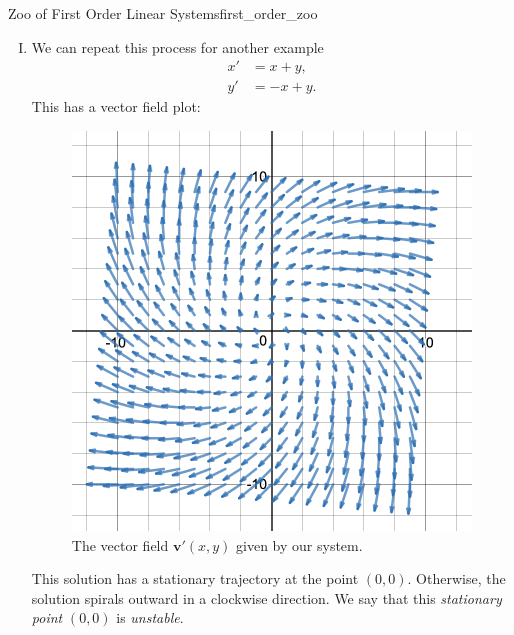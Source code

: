 \begin{ex}{Zoo of First Order Linear Systems}{first_order_zoo}
\begin{enumerate}[(I)]
            What we do next is pick an initial condition, $(x_0,y_0)$ and note that our vector field gives us the velocity vector $\mathbf{v}'(x_0,y_0)$ at that point. 
            
            The solution (curve/trajectory) to our system of ODE follows the vector field above since it describes the velocity of our curve at that point. We call this solution curve an \textbf{integral curve} as it is obtained (roughly) through integration of $\mathbf{v}'$.  However, you should know that it is not always possible to explicitly compute this integral.  We will learn techniques for solving certain systems, however.
            
            One should feel comfortable tracing an estimate for a solution curve for a given system as it gives a qualitative answer to the problem. In this case, if we pick a point along the line $y=-x$, the trajectory is stationary.  Otherwise, the solution follows a curve that is parallel to the $y=x$ line and the direction depends on which location it begins.
            \item We can repeat this process for another example
            \begin{align*}
                x' &= x+y,\\
                y' &= -x +y.
            \end{align*}
            This has a vector field plot:
            \begin{figure}[H]
                \centering
                \includegraphics[width=.6\textwidth]{Figures_Part_7/x+yx-y.png}
                \caption{The vector field $\mathbf{v}'(x,y)$ given by our system.}
            \end{figure}
            This solution has a stationary trajectory at the point $(0,0)$. Otherwise, the solution spirals outward in a clockwise direction. We say that this \emph{stationary point} $(0,0)$ is \emph{unstable}.

\end{enumerate}
\end{ex}

